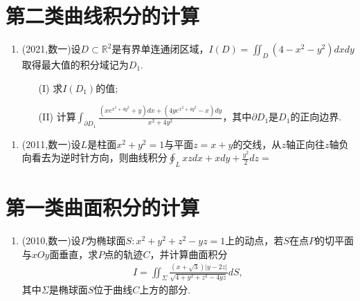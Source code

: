 \documentclass[12pt, a4paper, oneside, UTF8]{ctexbook}
\begin{document}
\section{第二类曲线积分的计算}

\begin{enumerate}[label=\arabic*.,start=5]
    \item (2021,数一)设$D\subset \mathbb{R}^2$是有界单连通闭区域，$I(D)=\iint_D(4-x^2-y^2)dxdy$取得最大值的积分域记为$D_1$.
    \begin{enumerate}
        \item[(I)] 求$I(D_1)$的值;
        \item[(II)] 计算$\int_{\partial D_1}\frac{(xe^{x^2+4y^2}+y)dx+(4ye^{x^2+4y^2}-x)dy}{x^2+4y^2}$，其中$\partial D_1$是$D_1$的正向边界.
    \end{enumerate}
    
    \begin{solution}
    \newpage
    \end{solution}
\end{enumerate}

\begin{enumerate}[label=\arabic*.,start=6]
    \item (2011,数一)设$L$是柱面$x^2+y^2=1$与平面$z=x+y$的交线，从$z$轴正向往$z$轴负向看去为逆时针方向，则曲线积分$\oint_L xz dx+xdy+\frac{y^2}{2}dz=$
    
    \begin{solution}
    \newpage
    \end{solution}
\end{enumerate}

\section{第一类曲面积分的计算}

\begin{enumerate}[label=\arabic*.,start=7]
    \item (2010,数一)设$P$为椭球面$S:x^2+y^2+z^2-yz=1$上的动点，若$S$在点$P$的切平面与$xOy$面垂直，求$P$点的轨迹$C$，并计算曲面积分
    \begin{align*}
    I=\iint_{\Sigma}\frac{(x+\sqrt{3})|y-2z|}{\sqrt{4+y^2+z^2-4yz}}dS,
    \end{align*}
    其中$\Sigma$是椭球面$S$位于曲线$C$上方的部分.
    
    \begin{solution}
    \newpage
    \end{solution}
\end{enumerate}
\end{document}
